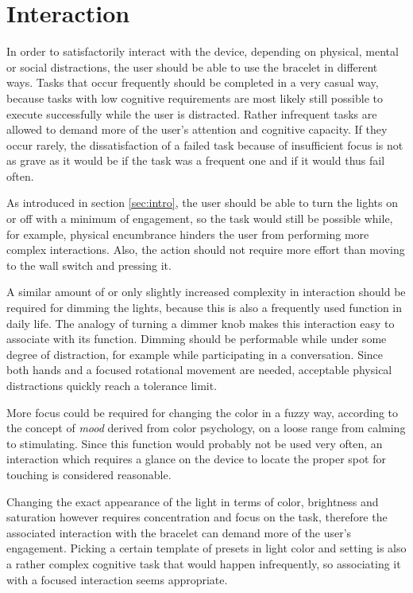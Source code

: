\chapter{Interaction}
\label{sec:interaction}
In order to satisfactorily interact with the device, depending on physical, mental or social distractions, the user should be able to use the bracelet in different ways. Tasks that occur frequently should be completed in a very casual way, because tasks with low cognitive requirements are most likely still possible to execute successfully while the user is distracted. Rather infrequent tasks are allowed to demand more of the user's attention and cognitive capacity. If they occur rarely, the dissatisfaction of a failed task because of insufficient focus is not as grave as it would be if the task was a frequent one and if it would thus fail often.

As introduced in section \ref{sec:intro}, the user should be able to turn the lights on or off with a minimum of engagement, so the task would still be possible while, for example, physical encumbrance hinders the user from performing more complex interactions. Also, the action should not require more effort than moving to the wall switch and pressing it. 

A similar amount of or only slightly increased complexity in interaction should be required for dimming the lights, because this is also a frequently used function in daily life. The analogy of turning a dimmer knob makes this interaction easy to associate with its function. Dimming should be performable while under some degree of distraction, for example while participating in a conversation. Since both hands and a focused rotational movement are needed, acceptable physical distractions quickly reach a tolerance limit.

More focus could be required for changing the color in a fuzzy way, according to the concept of \textit{mood} derived from color psychology, on a loose range from calming to stimulating. Since this function would probably not be used very often, an interaction which requires a glance on the device to locate the proper spot for touching is considered reasonable. 

Changing the exact appearance of the light in terms of color, brightness and saturation however requires concentration and focus on the task, therefore the associated interaction with the bracelet can demand more of the user's engagement. Picking a certain template of presets in light color and setting is also a rather complex cognitive task that would happen infrequently, so associating it with a focused interaction seems appropriate.

